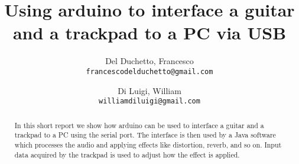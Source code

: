 \documentclass[]{article}
\title{Using arduino to interface a guitar and a trackpad to a PC via USB}
\author{
	Del Duchetto, Francesco\\
	\texttt{francescodelduchetto@gmail.com}
	\and
	Di Luigi, William\\
	\texttt{williamdiluigi@gmail.com}
}
\begin{document}
\maketitle

\begin{abstract}
	In this short report we show how arduino can be used to interface a guitar and a trackpad to a PC using the serial port. The interface is then used by a Java software which processes the audio and applying effects like distortion, reverb, and so on. Input data acquired by the trackpad is used to adjust how the effect is applied.
\end{abstract}

\section{}
\end{document}
